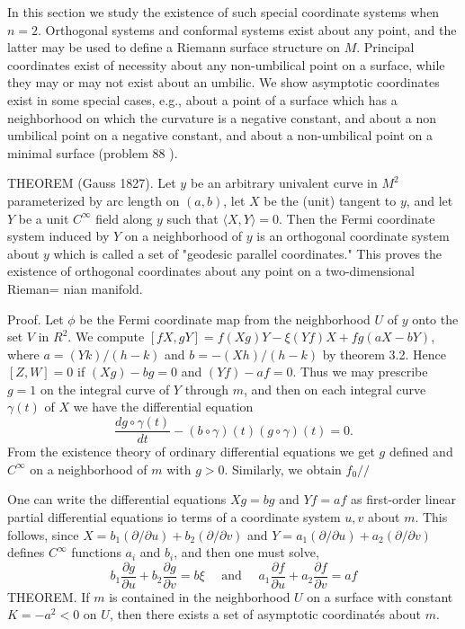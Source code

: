 \documentclass[10pt]{article}
\begin{document}
In this section we study the existence of such special coordinate systems when $n=2$. Orthogonal systems and conformal systems exist about any point, and the latter may be used to define a Riemann surface structure on $M$. Principal coordinates exist of necessity about any non-umbilical point on a surface, while they may or may not exist about an umbilic. We show asymptotic coordinates exist in some special cases, e.g., about a point of a surface which has a neighborhood on which the curvature is a negative constant, and about a non umbilical point on a negative constant, and about a non-umbilical point on a minimal surface (problem 88 ).

THEOREM (Gauss 1827). Let $y$ be an arbitrary univalent curve in $M^{2}$ parameterized by arc length on $(a, b)$, let $X$ be the (unit) tangent to $y$, and let $Y$ be a unit $C^{\infty}$ field along $y$ such that $\langle X, Y\rangle=0$. Then the Fermi coordinate system induced by $Y$ on a neighborhood of $y$ is an orthogonal coordinate system about $y$ which is called a set of "geodesic parallel coordinates." This proves the existence of orthogonal coordinates about any point on a two-dimensional Rieman= nian manifold.

Proof. Let $\phi$ be the Fermi coordinate map from the neighborhood $U$ of $y$ onto the set $V$ in $R^{2}$. We compute $[f X, g Y]=f(X g) Y-\xi(Y f) X+f g(a X-b Y)$, where $a=(Y k) /(h-k)$ and $b=-(X h) /(h-k)$ by theorem 3.2. Hence $[Z, W]=0$ if $(X g)-b g=0$ and $(Y f)-a f=0$. Thus we may prescribe $g=1$ on the integral curve of $Y$ through $m$, and then on each integral curve $\gamma(t)$ of $X$ we have the differential equation
$$
\frac{d g \circ \gamma(t)}{d t}-(b \circ \gamma)(t)(g \circ \gamma)(t)=0 .
$$
From the existence theory of ordinary differential equations we get $g$ defined and $C^{\infty}$ on a neighborhood of $m$ with $g>0$. Similarly, we obtain $f_{0} / /$

One can write the differential equations $X g=b g$ and $Y f=a f$ as first-order linear partial differential equations io terms of a coordinate system $u, v$ about $m$. This follows, since $X=b_{1}(\partial / \partial u)+b_{2}(\partial / \partial v)$ and $Y=a_{1}(\partial / \partial u)+a_{2}(\partial / \partial v)$ defines $C^{\infty}$ functions $a_{i}$ and $b_{i}$, and then one must solve,
$$
b_{1} \frac{\partial g}{\partial u}+b_{2} \frac{\partial g}{\partial v}=b \xi \quad \text { and } \quad a_{1} \frac{\partial f}{\partial u}+a_{2} \frac{\partial f}{\partial v}=a f
$$
THEOREM. If $m$ is contained in the neighborhood $U$ on a surface with constant $K=-a^{2}<0$ on $U$, then there exists a set of asymptotic coordinatés about $m$.
\end{document}
